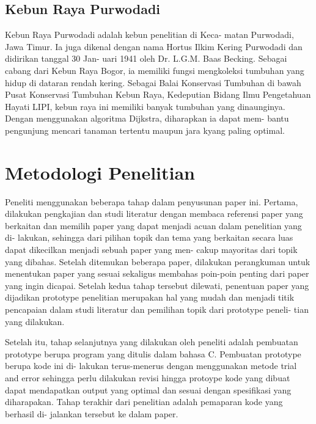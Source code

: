 \documentclass[conference]{IEEEtran}
\begin{document}
\subsection{Kebun Raya Purwodadi}
    Kebun  Raya  Purwodadi  adalah  kebun  penelitian  di  Keca-
    matan  Purwodadi,  Jawa  Timur.  Ia  juga  dikenal  dengan  nama
    Hortus Ilkim Kering Purwodadi dan didirikan tanggal 30 Jan-
    uari 1941 oleh Dr. L.G.M. Baas Becking. Sebagai cabang dari
    Kebun Raya Bogor, ia memiliki fungsi mengkoleksi tumbuhan
    yang hidup di dataran rendah kering. Sebagai Balai Konservasi
    Tumbuhan di bawah Pusat Konservasi Tumbuhan Kebun Raya,
    Kedeputian Bidang Ilmu Pengetahuan Hayati LIPI, kebun raya
    ini  memiliki  banyak  tumbuhan  yang  dinaunginya.  Dengan
    menggunakan  algoritma  Dijkstra,  diharapkan  ia  dapat  mem-
    bantu  pengunjung  mencari  tanaman  tertentu  maupun  jara
    kyang paling optimal.

\section{Metodologi Penelitian}
    Peneliti  menggunakan  beberapa  tahap  dalam  penyusunan
    paper  ini.  Pertama,  dilakukan  pengkajian  dan  studi  literatur
    dengan membaca referensi paper yang berkaitan dan memilih
    paper  yang  dapat  menjadi  acuan  dalam  penelitian  yang  di-
    lakukan, sehingga dari pilihan topik dan tema yang berkaitan
    secara luas dapat dikecilkan menjadi sebuah paper yang men-
    cakup  mayoritas  dari  topik  yang  dibahas.  Setelah  ditemukan
    beberapa  paper,  dilakukan  perangkuman  untuk  menentukan
    paper  yang  sesuai  sekaligus  membahas  poin-poin  penting
    dari  paper  yang  ingin  dicapai.  Setelah  kedua  tahap  tersebut
    dilewati, penentuan paper yang dijadikan prototype penelitian
    merupakan  hal  yang  mudah  dan  menjadi  titik  pencapaian
    dalam studi literatur dan pemilihan topik dari prototype peneli-
    tian yang dilakukan.\par

    Setelah  itu,  tahap  selanjutnya  yang  dilakukan  oleh  peneliti
    adalah   pembuatan   prototype   berupa   program   yang   ditulis
    dalam  bahasa  C.  Pembuatan  prototype  berupa  kode  ini  di-
    lakukan terus-menerus dengan menggunakan metode trial and
    error  sehingga  perlu  dilakukan  revisi  hingga  protoype  kode
    yang  dibuat  dapat  mendapatkan  output  yang  optimal  dan
    sesuai  dengan  spesifikasi  yang  diharapakan.  Tahap  terakhir
    dari   penelitian   adalah   pemaparan   kode   yang   berhasil   di-
    jalankan tersebut ke dalam paper.
\end{document}
